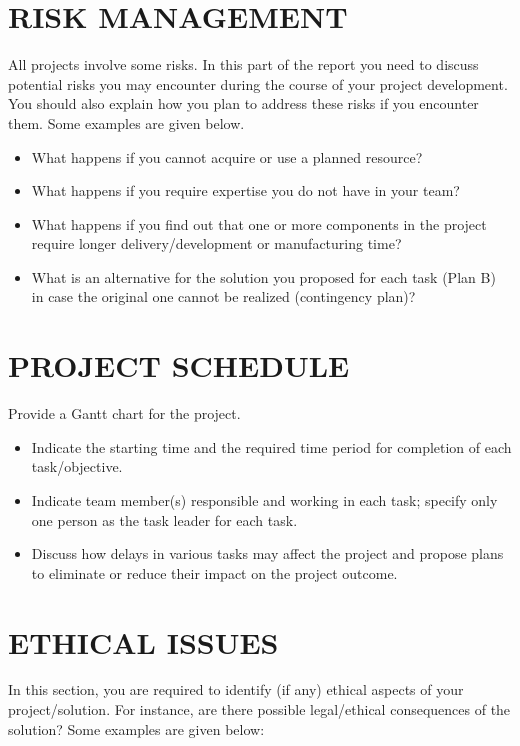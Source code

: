 \documentclass[12pt,a4paper]{article}
\begin{document}
\section{RISK MANAGEMENT}
All projects involve some risks. In this part of the report you need to discuss potential risks you may encounter during the course of your project development. You should also explain how you plan to address these risks if you encounter them. Some examples are given below.

\begin{itemize}[leftmargin=1.5em]
    \item What happens if you cannot acquire or use a planned resource?
    \item What happens if you require expertise you do not have in your team?
    \item What happens if you find out that one or more components in the project require longer delivery/development or manufacturing time?
    \item What is an alternative for the solution you proposed for each task (Plan B) in case the original one cannot be realized (contingency plan)?
\end{itemize}

\section{PROJECT SCHEDULE}
Provide a Gantt chart for the project.

\begin{itemize}[leftmargin=1.5em]
    \item Indicate the starting time and the required time period for completion of each task/objective.
    \item Indicate team member(s) responsible and working in each task; specify only one person as the task leader for each task.
    \item Discuss how delays in various tasks may affect the project and propose plans to eliminate or reduce their impact on the project outcome.
\end{itemize}

\section{ETHICAL ISSUES}
In this section, you are required to identify (if any) ethical aspects of your project/solution. For instance, are there possible legal/ethical consequences of the solution? Some examples are given below:
\end{document}
